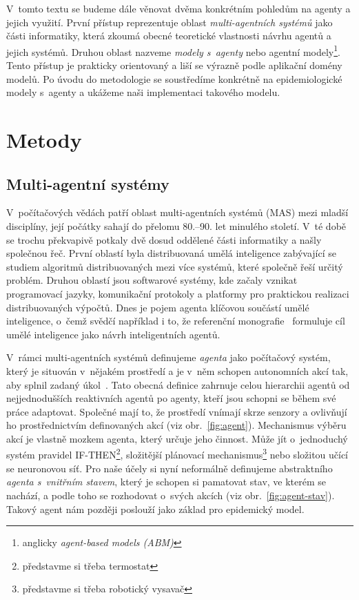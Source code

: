 V~tomto textu se budeme dále věnovat dvěma konkrétním pohledům na agenty a jejich využití. První přístup reprezentuje oblast \emph{multi-agentních systémů} jako části informatiky, která zkoumá obecné teoretické vlastnosti návrhu agentů a jejich systémů. Druhou oblast nazveme \emph{modely s~agenty} nebo agentní modely\footnote{anglicky \emph{agent-based models (ABM)}}. Tento přístup je prakticky orientovaný a liší se výrazně podle aplikační domény modelů. Po úvodu do metodologie se soustředíme konkrétně na epidemiologické modely s~agenty a ukážeme naši implementaci takového modelu.

\section*{Metody} 

\subsection*{Multi-agentní systémy}

V~počítačových vědách patří oblast multi-agentních systémů (MAS) mezi mladší disciplíny, její počátky sahají do přelomu 80.--90. let minulého století. V~té době se trochu překvapivě potkaly dvě dosud oddělené části informatiky a našly společnou řeč. První oblastí byla distribuovaná umělá inteligence zabývající se studiem algoritmů distribuovaných mezi více systémů, které společně řeší určitý problém. Druhou oblastí jsou softwarové systémy, kde začaly vznikat programovací jazyky, komunikační protokoly a platformy pro praktickou realizaci distribuovaných výpočtů. Dnes je pojem agenta klíčovou součástí umělé inteligence, o~čemž svědčí například i to, že referenční monografie~\cite{AIMA20} formuluje cíl umělé inteligence jako návrh inteligentních agentů. 

V~rámci multi-agentních systémů definujeme \emph{agenta} jako počítačový systém, který je situován v~nějakém prostředí a je v~něm schopen autonomních akcí tak, aby splnil zadaný úkol~\cite{Wooldridge09}. Tato obecná definice zahrnuje celou hierarchii agentů od nejjednodušších reaktivních agentů po  agenty, kteří jsou schopni se během své práce adaptovat. Společné mají to, že prostředí vnímají skrze senzory a ovlivňují ho prostřednictvím definovaných akcí (viz obr.~\ref{fig:agent}). Mechanismus výběru akcí je vlastně mozkem agenta, který určuje jeho činnost. Může jít o~jednoduchý systém pravidel IF-THEN\footnote{představme si třeba termostat}, složitější plánovací mechanismus\footnote{představme si třeba robotický vysavač} nebo složitou učící se neuronovou síť. Pro naše účely si nyní neformálně definujeme abstraktního \emph{agenta s~vnitřním stavem}, který je schopen si pamatovat stav, ve kterém se nachází, a podle toho se rozhodovat o~svých akcích (viz obr.~\ref{fig:agent-stav}). Takový agent nám později poslouží jako základ pro epidemický model.  

